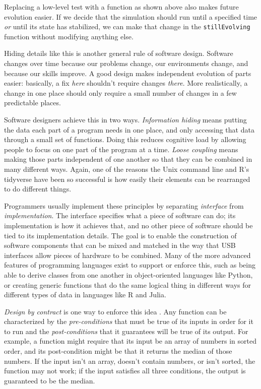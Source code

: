 \documentclass[10pt,letterpaper]{article}
\begin{document}
Replacing a low-level test with a function as shown above also makes future evolution easier.
If we decide that the simulation should run until a specified time
\emph{or} until its state has stabilized,
we can make that change in the \texttt{stillEvolving} function
without modifying anything else.

Hiding details like this is another general rule of software design.
Software changes over time because our problems change,
our environments change,
and because our skills improve.
A good design makes independent evolution of parts easier:
basically,
a fix \emph{here} shouldn't require changes \emph{there}.
More realistically,
a change in one place should only require a small number of changes
in a few predictable places.

Software designers achieve this in two ways.
\emph{Information hiding} means
putting the data each part of a program needs in one place,
and only accessing that data through a small set of functions.
Doing this reduces cognitive load
by allowing people to focus on one part of the program at a time.
\emph{Loose coupling} means making those parts independent of one another
so that they can be combined in many different ways.
Again,
one of the reasons the Unix command line and R's tidyverse have been so successful
is how easily their elements can be rearranged to do different things.

Programmers usually implement these principles
by separating \emph{interface} from \emph{implementation}.
The interface specifies what a piece of software can do;
its implementation is how it achieves that,
and no other piece of software should be tied to its implementation details.
The goal is to enable the construction of software components
that can be mixed and matched in the way that USB interfaces allow pieces of hardware to be combined.
Many of the more advanced features of programming languages exist to support or enforce this,
such as being able to derive classes from one another in object-oriented languages like Python,
or creating generic functions that do the same logical thing in different ways for different types of data in languages like R and Julia.

\emph{Design by contract} is one way to enforce this idea \cite{Meyer1994}.
Any function can be characterized by
the \emph{pre-conditions} that must be true of its inputs in order for it to run
and the \emph{post-conditions} that it guarantees will be true of its output.
For example,
a function might require that its input be an array of numbers in sorted order,
and its post-condition might be that it returns the median of those numbers.
If the input isn't an array, doesn't contain numbers, or isn't sorted,
the function may not work;
if the input satisfies all three conditions,
the output is guaranteed to be the median.
\end{document}
